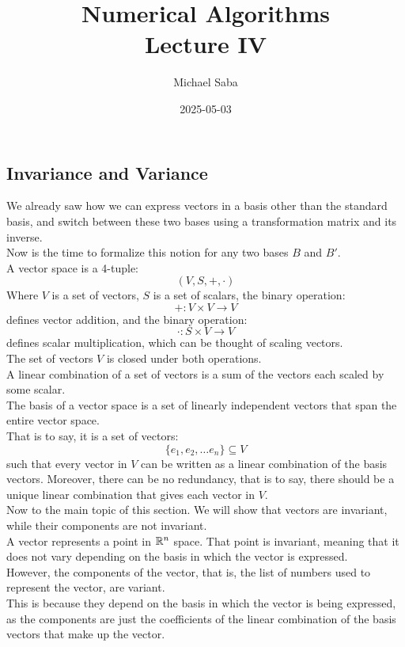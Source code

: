\documentclass[12pt]{article}
\title{%
    \Huge Numerical Algorithms \\
    \Large Lecture IV
}
\date{2025-05-03}
\author{Michael Saba}
\begin{document}
\maketitle
\newpage
\setlength{\parindent}{0pt}

\subsection*{Invariance and Variance}

We already saw how we can express vectors
in a basis other than the standard basis,
and switch between these two bases using
a transformation matrix and its inverse. \\
Now is the time to formalize this notion
for any two bases $B$ and $B'$. \\

A vector space is a 4-tuple:
\[ (V, S, +, \cdot) \]
Where $V$ is a set of vectors,
$S$ is a set of scalars,
the binary operation:
\[ +:V \times V \to V \]
defines vector addition,
and the binary operation:
\[ \cdot: S \times V \to V \]
defines scalar multiplication,
which can be thought of scaling vectors. \\
The set of vectors $V$ is closed under
both operations. \\

A linear combination of a set of vectors
is a sum of the vectors each scaled by
some scalar. \\

The basis of a vector space
is a set of linearly independent vectors
that span the entire vector space. \\
That is to say, it is a set of vectors:
\[ \{ e_1, e_2, \dots e_n \} \subseteq V \]
such that every vector in $V$
can be written as a linear combination
of the basis vectors. Moreover,
there can be no redundancy,
that is to say,
there should be a unique linear combination
that gives each vector in $V$. \\

Now to the main topic of this section.
We will show that vectors are invariant,
while their components are not invariant. \\

A vector represents a point in $\mathbb{R}^n$
space. That point is invariant,
meaning that it does not vary depending
on the basis in which the vector is expressed. \\

However, the components of the vector,
that is, the list of numbers used to represent
the vector, are variant. \\
This is because they
depend on the basis in which the vector
is being expressed, as the components are just
the coefficients of the linear combination
of the basis vectors that make up the vector. \\
\end{document}

